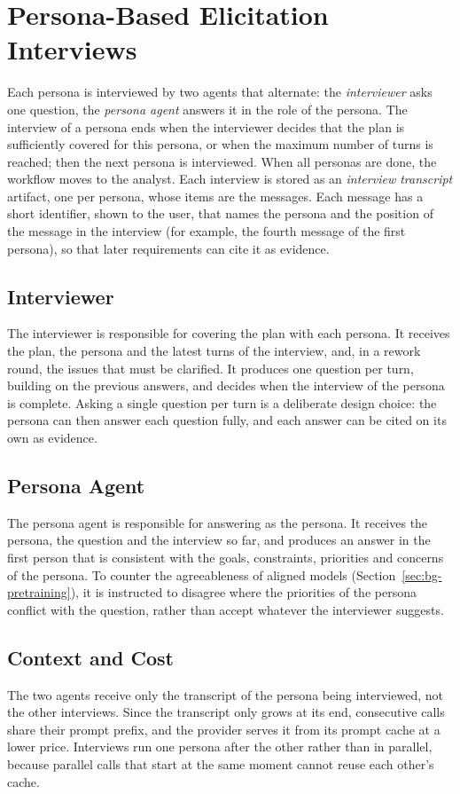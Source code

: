 \section{Persona-Based Elicitation Interviews}
\label{sec:pa-elicitation}

Each persona is interviewed by two agents that alternate: the \emph{interviewer} asks one question, the \emph{persona agent} answers it in the role of the persona. The interview of a persona ends when the interviewer decides that the plan is sufficiently covered for this persona, or when the maximum number of turns is reached; then the next persona is interviewed. When all personas are done, the workflow moves to the analyst. Each interview is stored as an \emph{interview transcript} artifact, one per persona, whose items are the messages. Each message has a short identifier, shown to the user, that names the persona and the position of the message in the interview (for example, the fourth message of the first persona), so that later requirements can cite it as evidence.

\subsection{Interviewer}
\label{sec:pa-interviewer}

The interviewer is responsible for covering the plan with each persona. It receives the plan, the persona and the latest turns of the interview, and, in a rework round, the issues that must be clarified. It produces one question per turn, building on the previous answers, and decides when the interview of the persona is complete. Asking a single question per turn is a deliberate design choice: the persona can then answer each question fully, and each answer can be cited on its own as evidence.

\subsection{Persona Agent}
\label{sec:pa-persona-agent}

The persona agent is responsible for answering as the persona. It receives the persona, the question and the interview so far, and produces an answer in the first person that is consistent with the goals, constraints, priorities and concerns of the persona. To counter the agreeableness of aligned models (Section~\ref{sec:bg-pretraining}), it is instructed to disagree where the priorities of the persona conflict with the question, rather than accept whatever the interviewer suggests.

\subsection{Context and Cost}
\label{sec:pa-interview-cost}

The two agents receive only the transcript of the persona being interviewed, not the other interviews. Since the transcript only grows at its end, consecutive calls share their prompt prefix, and the provider serves it from its prompt cache at a lower price. Interviews run one persona after the other rather than in parallel, because parallel calls that start at the same moment cannot reuse each other's cache.
